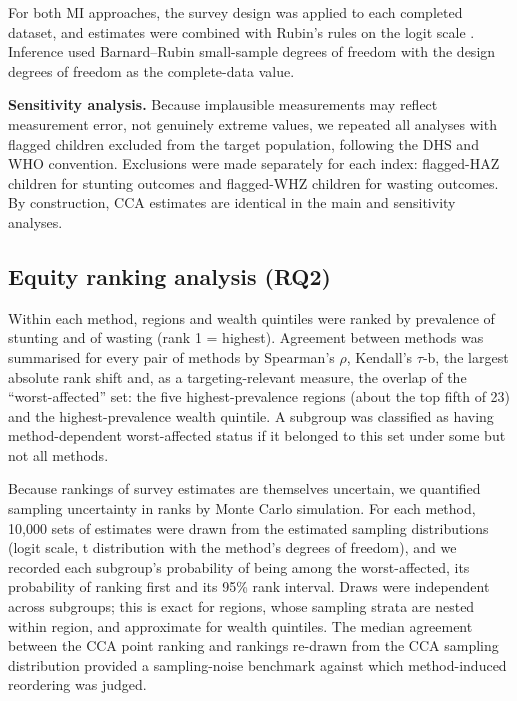 \documentclass[11pt,a4paper]{article}
\begin{document}
For both MI approaches, the survey design was applied to each completed
dataset, and estimates were combined with Rubin's rules
\cite{rubin1987multiple} on the logit scale
\cite{marshall2009combining}. Inference used Barnard--Rubin small-sample
degrees of freedom \cite{barnard1999small} with the design degrees of
freedom as the complete-data value.

\textbf{Sensitivity analysis.} Because implausible measurements may
reflect measurement error, not genuinely extreme values, we repeated all
analyses with flagged children excluded from the target population,
following the DHS and WHO convention. Exclusions were made separately
for each index: flagged-HAZ children for stunting outcomes and
flagged-WHZ children for wasting outcomes. By construction, CCA
estimates are identical in the main and sensitivity analyses.

\subsection{Equity ranking analysis
(RQ2)}\label{equity-ranking-analysis-rq2}

Within each method, regions and wealth quintiles were ranked by
prevalence of stunting and of wasting (rank 1 = highest). Agreement
between methods was summarised for every pair of methods by Spearman's
$\rho$, Kendall's $\tau$-b, the largest absolute rank shift and, as a
targeting-relevant measure, the overlap of the ``worst-affected'' set:
the five highest-prevalence regions (about the top fifth of 23) and the
highest-prevalence wealth quintile. A subgroup was classified as having
method-dependent worst-affected status if it belonged to this set under
some but not all methods.

Because rankings of survey estimates are themselves uncertain, we
quantified sampling uncertainty in ranks by Monte Carlo simulation. For
each method, 10,000 sets of estimates were drawn from the estimated
sampling distributions (logit scale, t distribution with the method's
degrees of freedom), and we recorded each subgroup's probability of
being among the worst-affected, its probability of ranking first and its
95\% rank interval. Draws were independent across subgroups; this is
exact for regions, whose sampling strata are nested within region, and
approximate for wealth quintiles. The median agreement between the CCA
point ranking and rankings re-drawn from the CCA sampling distribution
provided a sampling-noise benchmark against which method-induced
reordering was judged.
\end{document}
